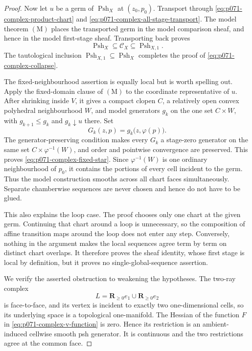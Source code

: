 \begin{proof}
Now let \(u\) be a germ of \(\operatorname{Psh}_X\) at
\((z_0,p_0)\).  Transport through
\eqref{eq:p071-complex-product-chart} and
\eqref{eq:p071-complex-all-stage-transport}.  The model theorem
\((\mathrm M)\) places the transported germ in the model comparison sheaf,
and hence in the model first-stage sheaf.  Transporting back proves
\begin{equation}
                  \operatorname{Psh}_X
                  \subseteq\mathscr C_X
                  \subseteq\operatorname{Psh}_{X,1}.
 \label{eq:p071-complex-two-inclusions}
\end{equation}
The tautological inclusion
\(\operatorname{Psh}_{X,1}\subseteq\operatorname{Psh}_X\) completes the
proof of \eqref{eq:p071-complex-collapse}.

The fixed-neighbourhood assertion is equally local but is worth spelling
out.  Apply the fixed-domain clause of \((\mathrm M)\) to the coordinate
representative of \(u\).  After shrinking inside \(V\), it gives a compact
clopen \(C\), a relatively open convex polyhedral neighbourhood \(W\), and
model generators \(g_k\) on the one set \(C\times W\), with
\(g_{k+1}\leq g_k\) and \(g_k\downarrow u\) there.  Set
\begin{equation}
        G_k(z,p)=g_k\bigl(z,\varphi(p)\bigr).
 \label{eq:p071-complex-pulled-approximants}
\end{equation}
The generator-preserving condition makes every \(G_k\) a stage-zero
generator on the same set
\(C\times\varphi^{-1}(W)\), and order and pointwise convergence are
preserved.  This proves \eqref{eq:p071-complex-fixed-star}.  Since
\(\varphi^{-1}(W)\) is one ordinary neighbourhood of \(p_0\), it contains
the portions of every cell incident to the germ.  Thus the model
construction smooths across all chart faces simultaneously.  Separate
chamberwise sequences are never chosen and hence do not have to be glued.

This also explains the loop case.  The proof chooses only one chart at the
given germ.  Continuing that chart around a loop is unnecessary, so the
composition of affine transition maps around the loop does not enter any
step.  Conversely, nothing in the argument makes the local sequences agree
term by term on distinct chart overlaps.  It therefore proves the sheaf
identity, whose first stage is local by definition, but it proves no
single-global-sequence assertion.

We verify the asserted obstruction to weakening the hypotheses.  The
two-ray complex
\[
        L=\mathbf R_{\geq0}e_1\cup\mathbf R_{\geq0}e_2
\]
is face-to-face, and its vertex is incident to exactly two one-dimensional
cells, so its underlying space is a topological one-manifold.  The Hessian
of the function \(F\) in \eqref{eq:p071-complex-v-function} is zero.
Hence its restriction is an ambient-induced cellwise smooth psh generator.
It is continuous and the two restrictions agree at the common face.


\end{proof}
